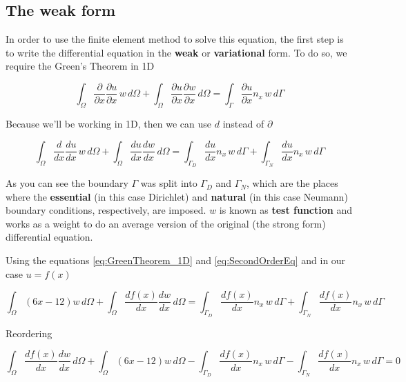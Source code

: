 \documentclass[letterpaper,10pt]{article}
\begin{document}



\subsection{The weak form}

In order to use the finite element method to solve this equation, the first step is to write the differential equation in the \textbf{weak} or \textbf{variational} form. To do so, we require the Green's Theorem in 1D

\[
\int_{\Omega} \frac{\partial}{\partial x} \frac{\partial u}{\partial x} \, w \, d\Omega + \int_{\Omega} \frac{\partial u}{\partial x} \frac{\partial w}{\partial x} \, d\Omega = \int_{\Gamma} \frac{\partial u}{\partial x} n_x \, w \, d\Gamma
\]

Because we'll be working in 1D, then we can use $d$ instead of $\partial$



\begin{equation}
\int_{\Omega} \frac{d}{d x} \frac{d u}{d x} \, w \, d\Omega + \int_{\Omega} \frac{d u}{d x} \frac{d w}{d x} \, d\Omega = \int_{\Gamma_D} \frac{d u}{d x} n_x \, w \, d\Gamma + \int_{\Gamma_N} \frac{d u}{d x} n_x \, w \, d\Gamma
\label{eq:GreenTheorem_1D}
\end{equation}

As you can see the boundary $\Gamma$ was split into $\Gamma_D$ and $\Gamma_N$, which are the places where the \textbf{essential} (in this case Dirichlet) %
and \textbf{natural} (in this case Neumann) %
 boundary conditions, respectively, are imposed. $w$ is known as \textbf{test function} and works as a weight to do an average version of the original (the strong form) differential equation.

Using the equations \ref{eq:GreenTheorem_1D} and \ref{eq:SecondOrderEq} and in our case $u = f(x)$

\[
\int_{\Omega} (6x-12) w \, d\Omega + \int_{\Omega} \frac{d f(x)}{d x} \frac{d w}{d x} \, d\Omega = \int_{\Gamma_D} \frac{d f(x)}{d x} n_x \, w \, d\Gamma + \int_{\Gamma_N} \frac{d f(x)}{d x} n_x \, w \, d\Gamma
\]

Reordering

\[
\int_{\Omega} \frac{d f(x)}{d x} \frac{d w}{d x} \, d\Omega + \int_{\Omega} (6x-12) w \, d\Omega - \int_{\Gamma_D} \frac{d f(x)}{d x} n_x \, w \, d\Gamma - \int_{\Gamma_N} \frac{d f(x)}{d x} n_x \, w \, d\Gamma = 0
\]
\end{document}
